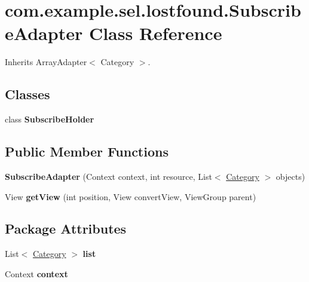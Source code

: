 \hypertarget{classcom_1_1example_1_1sel_1_1lostfound_1_1SubscribeAdapter}{\section{com.\-example.\-sel.\-lostfound.\-Subscribe\-Adapter \-Class \-Reference}
\label{classcom_1_1example_1_1sel_1_1lostfound_1_1SubscribeAdapter}
}


\-Inherits \-Array\-Adapter$<$ Category $>$.

\subsection*{\-Classes}
\begin{DoxyCompactItemize}
\item 
class {\bfseries \-Subscribe\-Holder}
\end{DoxyCompactItemize}
\subsection*{\-Public \-Member \-Functions}
\begin{DoxyCompactItemize}
\item 
\hypertarget{classcom_1_1example_1_1sel_1_1lostfound_1_1SubscribeAdapter_ad5670875fa5fcc236d9c794303f04369}{{\bfseries \-Subscribe\-Adapter} (\-Context context, int resource, \-List$<$ \hyperlink{classcom_1_1example_1_1sel_1_1lostfound_1_1Category}{\-Category} $>$ objects)}\label{classcom_1_1example_1_1sel_1_1lostfound_1_1SubscribeAdapter_ad5670875fa5fcc236d9c794303f04369}

\item 
\hypertarget{classcom_1_1example_1_1sel_1_1lostfound_1_1SubscribeAdapter_a942f195e46312808aff706a8a4e15e02}{\-View {\bfseries get\-View} (int position, \-View convert\-View, \-View\-Group parent)}\label{classcom_1_1example_1_1sel_1_1lostfound_1_1SubscribeAdapter_a942f195e46312808aff706a8a4e15e02}

\end{DoxyCompactItemize}
\subsection*{\-Package \-Attributes}
\begin{DoxyCompactItemize}
\item 
\hypertarget{classcom_1_1example_1_1sel_1_1lostfound_1_1SubscribeAdapter_a9f604b1a005e9cc04e54497d9e58054f}{\-List$<$ \hyperlink{classcom_1_1example_1_1sel_1_1lostfound_1_1Category}{\-Category} $>$ {\bfseries list}}\label{classcom_1_1example_1_1sel_1_1lostfound_1_1SubscribeAdapter_a9f604b1a005e9cc04e54497d9e58054f}

\item 
\hypertarget{classcom_1_1example_1_1sel_1_1lostfound_1_1SubscribeAdapter_a98b58d40ae29eb5f31f868e0ac3e7709}{\-Context {\bfseries context}}\label{classcom_1_1example_1_1sel_1_1lostfound_1_1SubscribeAdapter_a98b58d40ae29eb5f31f868e0ac3e7709}

\end{DoxyCompactItemize}


